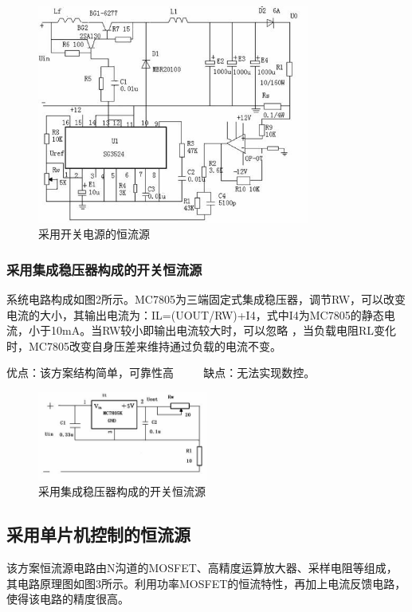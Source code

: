\documentclass{zjureport}
\begin{document}
            \begin{figure}[thp]
                \centering
                \includegraphics[width = 0.8\textwidth]{figure/采用开关电路的恒流源.jpg}
                \caption{采用开关电源的恒流源}
            \end{figure}

            \subsubsection{采用集成稳压器构成的开关恒流源}
            系统电路构成如图2所示。MC7805为三端固定式集成稳压器，调节RW，可以改变电流的大小，其输出电流为：IL=(UOUT/RW)+I4，式中I4为MC7805的静态电流，小于10mA。当RW较小即输出电流较大时，可以忽略 ，当负载电阻RL变化时，MC7805改变自身压差来维持通过负载的电流不变。

            优点：该方案结构简单，可靠性高
　　
            缺点：无法实现数控。

            \begin{figure}[thp]
                \centering
                \includegraphics[width = 0.5\textwidth]{figure/采用集成稳压器的开关恒流源.jpg}
                \caption{采用集成稳压器构成的开关恒流源}
            \end{figure}

            \subsection{采用单片机控制的恒流源}
            该方案恒流源电路由N沟道的MOSFET、高精度运算放大器、采样电阻等组成，其电路原理图如图3所示。利用功率MOSFET的恒流特性，再加上电流反馈电路，使得该电路的精度很高。
\end{document}

